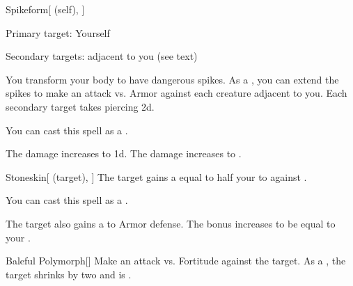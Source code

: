 \lowercase{\hypertarget{spell:Spikeform}{}}\label{spell:Spikeform}
\begin{attuneability}[Rank 4]{\hypertarget{spell:Spikeform}{Spikeform}}[ (self), ]

Primary target: Yourself
\par\noindent
Secondary targets:  adjacent to you (see text)

You transform your body to have dangerous spikes.
As a , you can extend the spikes to make an attack vs. Armor against each creature adjacent to you.
\hit Each secondary target takes piercing  \minus2d.

You can cast this spell as a .

\rankline
{} The damage increases to  \minus1d.
 The damage increases to .
\end{attuneability}
\vspace{0.25em}



\lowercase{\hypertarget{spell:Stoneskin}{}}\label{spell:Stoneskin}
\begin{attuneability}[Rank 4]{\hypertarget{spell:Stoneskin}{Stoneskin}}[ (target), ]
The target gains a  equal to half your  to  against .

You can cast this spell as a .

\rankline
{} The target also gains a   to Armor defense.
 The bonus increases to be equal to your .
\end{attuneability}
\vspace{0.25em}



\lowercase{\hypertarget{spell:Baleful Polymorph}{}}\label{spell:Baleful Polymorph}
\begin{freeability}[Rank 7]{\hypertarget{spell:Baleful Polymorph}{Baleful Polymorph}}[]
Make an attack vs. Fortitude against the target.
\hit As a , the target shrinks by two  and is .
\end{freeability}
\vspace{0.25em}



